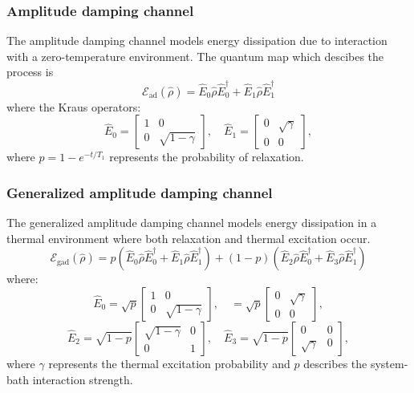 \subsubsection{Amplitude damping channel}
The amplitude damping channel models energy dissipation due to interaction with a zero-temperature environment. The quantum map which descibes the process is 
\begin{equation}\label{eq:amplitude_damping}
    \mathcal{E}_{\text{ad}}(\hat{\rho}) = \hat{E}_0 \hat{\rho} \hat{E}_0^{\dagger} + \hat{E}_1 \hat{\rho} \hat{E}_1^{\dagger}
\end{equation}
where the Kraus operators:
\begin{equation}
    \hat{E}_0 = \begin{bmatrix} 1 & 0 \\ 0 & \sqrt{1 - \gamma} \end{bmatrix}, \quad
    \hat{E}_1 = \begin{bmatrix} 0 & \sqrt{\gamma} \\ 0 & 0 \end{bmatrix},
\end{equation}
where $p = 1 - e^{-t/T_1}$ represents the probability of relaxation.

\subsubsection{Generalized amplitude damping channel}
The generalized amplitude damping channel models energy dissipation in a thermal environment where both relaxation and thermal excitation occur. 
\begin{equation}\label{eq:GAD_channel}
    \mathcal{E}_{\text{gad}}(\hat{\rho}) = p \left( \hat{E}_0 \hat{\rho} \hat{E}_0^{\dagger} + \hat{E}_1 \hat{\rho} \hat{E}_1^{\dagger} \right) + (1 - p) \left( \hat{E}_2 \hat{\rho} \hat{E}_0^{\dagger} + \hat{E}_3 \hat{\rho} \hat{E}_1^{\dagger} \right)
\end{equation}
where:
\begin{equation}
    \hat{E}_0 = \sqrt{p} \begin{bmatrix} 1 & 0 \\ 0 & \sqrt{1 - \gamma} \end{bmatrix}, \quad
     = \sqrt{p} \begin{bmatrix} 0 & \sqrt{\gamma} \\ 0 & 0 \end{bmatrix},
\end{equation}
\begin{equation}
    \hat{E}_2 = \sqrt{1 - p} \begin{bmatrix} \sqrt{1 - \gamma} & 0 \\ 0 & 1 \end{bmatrix}, \quad
    \hat{E}_3 = \sqrt{1 - p} \begin{bmatrix} 0 & 0 \\ \sqrt{\gamma} & 0 \end{bmatrix},
\end{equation}
where $\gamma$ represents the thermal excitation probability and $p$ describes the system-bath interaction strength.

